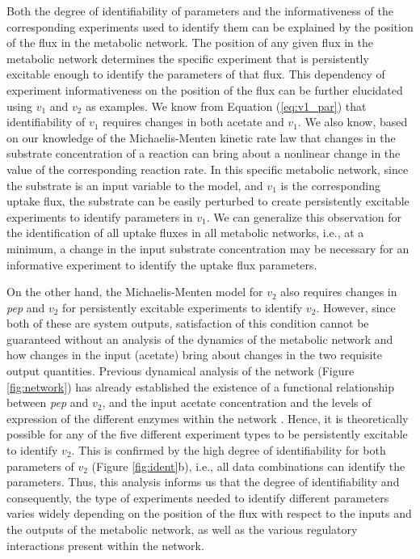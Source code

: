 \documentclass[10pt]{article}
\begin{document}
	Both the degree of identifiability of parameters and the informativeness of the corresponding experiments used to identify them can be explained by the position of the flux in the metabolic network. The position of any given flux in the metabolic network determines the specific experiment that is persistently excitable enough to identify the parameters of that flux. This dependency of experiment informativeness on the position of the flux can be further elucidated using $v_1$ and $v_2$ as examples. We know from Equation (\ref{eq:v1_par}) that identifiability of $v_1$ requires changes in both acetate and $v_1$. We also know, based on our knowledge of the Michaelis-Menten kinetic rate law that changes in the substrate concentration of a reaction can bring about a nonlinear change in the value of the corresponding reaction rate. In this specific metabolic network, since the substrate is an input variable to the model, and $v_1$ is the corresponding uptake flux, the substrate can be easily perturbed to create persistently excitable experiments to identify parameters in $v_1$. We can generalize this observation for the identification of all uptake fluxes in all metabolic networks, i.e., at a minimum, a change in the input substrate concentration may be necessary for an informative experiment to identify the uptake flux parameters. 
	
	On the other hand, the Michaelis-Menten model for $v_2$ also requires changes in \textit{pep} and $v_2$ for persistently excitable experiments to identify $v_2$. However, since both of these are system outputs, satisfaction of this condition cannot be guaranteed without an analysis of the dynamics of the metabolic network and how changes in the input (acetate) bring about changes in the two requisite output quantities. Previous dynamical analysis of the network (Figure \ref{fig:network}) has already established the existence of a functional relationship between \textit{pep} and $v_2$, and the input acetate concentration and the levels of expression of the different enzymes within the network \parencite{Srinivasan2017}. Hence, it is theoretically possible for any of the five different experiment types to be persistently excitable to identify $v_2$. This is confirmed by the high degree of identifiability for both parameters of $v_2$ (Figure \ref{fig:ident}b), i.e., all data combinations can identify the parameters. Thus, this analysis informs us that the degree of identifiability and consequently, the type of experiments needed to identify different parameters varies widely depending on the position of the flux with respect to the inputs and the outputs of the metabolic network, as well as the various regulatory interactions present within the network. 
	
\end{document}
